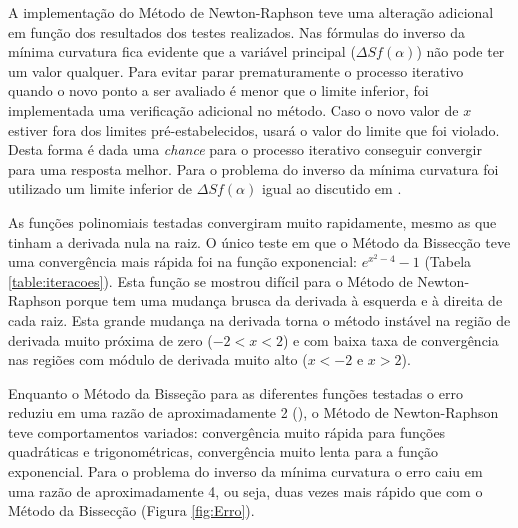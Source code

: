 \documentclass[final,5p]{elsarticle}
\numberwithin{equation}{section}
\begin{document}
    A implementação do Método de Newton-Raphson teve uma alteração adicional em função dos resultados dos testes realizados. Nas fórmulas do inverso da mínima curvatura fica evidente que a variável principal ($\Delta S f(\alpha)$) não pode ter um valor qualquer. Para evitar parar prematuramente o processo iterativo quando o novo ponto a ser avaliado é menor que o limite inferior, foi implementada uma verificação adicional no método. Caso o novo valor de $x$ estiver fora dos limites pré-estabelecidos, usará o valor do limite que foi violado. Desta forma é dada uma \emph{chance} para o processo iterativo conseguir convergir para uma resposta melhor. Para o problema do inverso da mínima curvatura foi utilizado um limite inferior de $\Delta S f(\alpha)$ igual ao discutido em \cite{relatoriobisseccao}.

    As funções polinomiais testadas convergiram muito rapidamente, mesmo as que tinham a derivada nula na raiz. O único teste em que o Método da Bissecção teve uma convergência mais rápida foi na função exponencial: $e^{x^2-4}-1$ (Tabela \ref{table:iteracoes}). Esta função se mostrou difícil para o Método de Newton-Raphson porque tem uma mudança brusca da derivada à esquerda e à direita de cada raiz. Esta grande mudança na derivada torna o método instável na região de derivada muito próxima de zero ($-2<x<2$) e com baixa taxa de convergência nas regiões com módulo de derivada muito alto ($x<-2$ e $x>2$). 
    
    Enquanto o Método da Bisseção para as diferentes funções testadas o erro reduziu em uma razão de aproximadamente 2 (\cite{relatoriobisseccao}), o Método de Newton-Raphson teve comportamentos variados: convergência muito rápida para funções quadráticas e trigonométricas, convergência muito lenta para a função exponencial. Para o problema do inverso da mínima curvatura o erro caiu em uma razão de aproximadamente 4, ou seja, duas vezes mais rápido que com o Método da Bissecção (Figura \ref{fig:Erro}). 
\end{document}
